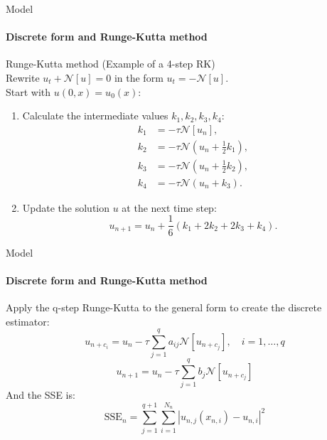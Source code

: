     \begin{frame}{Model}
    \framesubtitle{Discrete form and Runge-Kutta method}
        \begin{block}{Runge-Kutta method}
        (Example of a 4-step RK)\\
        Rewrite \( u_t + \mathcal{N}[u] = 0 \) in the form \( u_t = -\mathcal{N}[u] \).\\
        Start with \( u(0, x) = u_0(x) \):
        \begin{enumerate}
            \item Calculate the intermediate values \( k_1, k_2, k_3, k_4 \):
            \begin{align*}
                k_1 &= -\tau \mathcal{N}[u_n], \\
                k_2 &= -\tau \mathcal{N} \left( u_n + \frac{1}{2} k_1 \right), \\
                k_3 &= -\tau \mathcal{N} \left( u_n + \frac{1}{2} k_2 \right), \\
                k_4 &= -\tau \mathcal{N} \left( u_n + k_3 \right).
            \end{align*}
    
            \item Update the solution \( u \) at the next time step:
            \[
            u_{n+1} = u_n + \frac{1}{6} (k_1 + 2k_2 + 2k_3 + k_4).
            \]
        \end{enumerate}
        \end{block}
    \end{frame}
    
    \begin{frame}{Model}
    \framesubtitle{Discrete form and Runge-Kutta method}
        Apply the q-step Runge-Kutta to the general form to create the discrete estimator:
        \begin{equation}
        u_{n+c_i} = u_n - \tau \sum_{j=1}^q a_{ij} \mathcal{N}[u_{n+c_j}], \quad i = 1, \ldots, q
        \end{equation}
        \begin{equation}
        u_{n+1} = u_n - \tau \sum_{j=1}^q b_j \mathcal{N}[u_{n+c_j}]
        \end{equation}
        And the SSE is:
        \begin{equation}
        \text{SSE}_n = \sum_{j=1}^{q+1} \sum_{i=1}^{N_n} \left| u_{n,j}(x_{n,i}) - u_{n,i} \right|^2
        \end{equation}
    \end{frame}    
    
